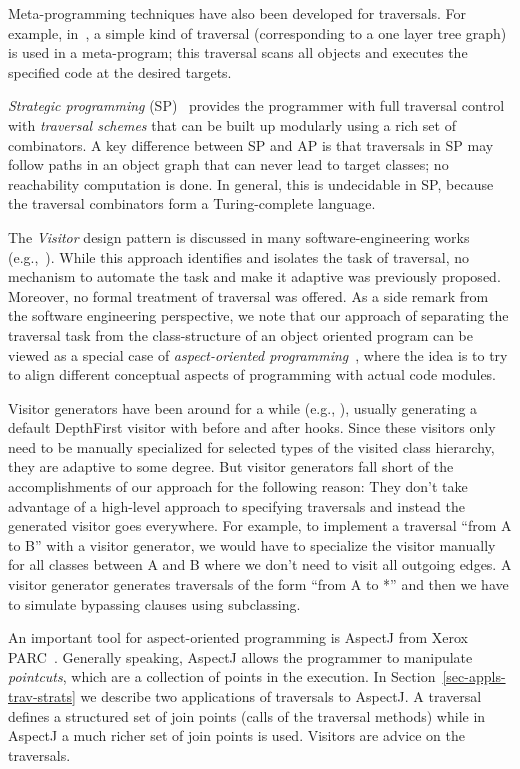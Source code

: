 Meta-programming techniques have also been developed for
traversals. For example, in~\cite{cameron-ito:gramps}, a simple kind
of traversal (corresponding to a one layer tree graph) is used in a
meta-program; this traversal scans all objects and executes the
specified code at the desired targets.

{\em Strategic programming} (SP)~\cite{LVV:strategic-programming}
provides the programmer with full traversal control with {\em
traversal schemes} that can be built up modularly using a rich set of
combinators.  A key difference between SP and AP is that traversals in
SP may follow paths in an object graph that can never lead to target
classes; no reachability computation is done.  In general, this is
undecidable in SP, because the traversal combinators form a
Turing-complete language.

The {\em Visitor} design pattern is discussed in many
software-engineering works (e.g.,~\cite{gang-of-4}). While this
approach identifies and isolates the task of traversal, no mechanism
to automate the task and make it adaptive was previously
proposed. Moreover, no formal treatment of traversal was offered.  As
a side remark from the software engineering perspective, we note that
our approach of separating the traversal task from the class-structure
of an object oriented program can be viewed as a special case of {\em
aspect-oriented programming}~\cite{cacm-2001}, where the idea is to try
to align different conceptual aspects of programming with actual code
modules.

Visitor generators have been around for a while (e.g.,
\cite{palsberg:jay,stirewalt01generation,bravenboer01guiding}),
usually generating a default DepthFirst visitor with before and after
hooks. Since these visitors only need to be manually specialized for
selected types of the visited class hierarchy, they are adaptive to
some degree. But visitor generators fall short of the accomplishments
of our approach for the following reason: They don't take advantage of
a high-level approach to specifying traversals and instead the
generated visitor goes everywhere. For example, to implement a
traversal {\sf ``from A to B''} with a visitor generator, we would
have to specialize the visitor manually for all classes between A and
B where we don't need to visit all outgoing edges. A visitor generator
generates traversals of the form {\sf ``from A to *''} and then we
have to simulate bypassing clauses using subclassing.

An important tool for aspect-oriented programming is AspectJ from
Xerox PARC~\cite{aop:ecoop2001}. Generally speaking, AspectJ allows the
programmer to manipulate {\em pointcuts}, which are a collection of
points in the execution. In Section~\ref{sec-appls-trav-strats} we
describe two applications of traversals to AspectJ. A traversal
defines a structured set of join points (calls of the traversal
methods) while in AspectJ a much richer set of join points is used.
Visitors are advice on the traversals.

